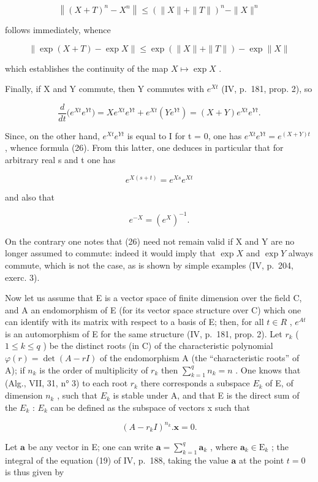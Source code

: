 \[
\left\| (X + T) ^ {n} - X ^ {n} \right\| \leqslant \left(\| X \| + \| T \|\right) ^ {n} - \| X \| ^ {n}
\]

follows immediately, whence

\[
\| \exp (X + T) - \exp X \| \leqslant \exp \left(\| X \| + \| T \|\right) - \exp \| X \|\tag{28}
\]

which establishes the continuity of the map \(X \mapsto \exp X\) .

Finally, if X and Y commute, then Y commutes with \(e^{Xt}\) (IV, p.~181, prop. 2), so

\[
\frac {d}{d t} \big (e ^ {X t} e ^ {Y t} \big) = X e ^ {X t} e ^ {Y t} + e ^ {X t} (Y e ^ {Y t}) = (X + Y) e ^ {X t} e ^ {Y t}.
\]

Since, on the other hand, \(e^{Xt}e^{Yt}\) is equal to I for t = 0, one has \(e^{Xt}e^{Yt} = e^{(X+Y)t}\) , whence formula (26). From this latter, one deduces in particular that for arbitrary real s and t one has

\[
e ^ {X (s + t)} = e ^ {X s} e ^ {X t}\tag{29}
\]

and also that

\[
e ^ {- X} = \left(e ^ {X}\right) ^ {- 1}.\tag{30}
\]

On the contrary one notes that (26) need not remain valid if X and Y are no longer assumed to commute: indeed it would imply that \(\exp X\) and \(\exp Y\) always commute, which is not the case, as is shown by simple examples (IV, p.~204, exerc. 3).

Now let us assume that E is a vector space of finite dimension over the field C, and A an endomorphism of E (for its vector space structure over C) which one can identify with its matrix with respect to a basis of E; then, for all \(t \in R\) , \(e^{At}\) is an automorphism of E for the same structure (IV, p.~181, prop. 2). Let \(r_k\) ( \(1 \leqslant k \leqslant q\) ) be the distinct roots (in C) of the characteristic polynomial \(\varphi(r) = \det(A - rI)\) of the endomorphism A (the ``characteristic roots'' of A); if \(n_k\) is the order of multiplicity of \(r_k\) then \(\sum_{k=1}^{q} n_k = n\) . One knows that (Alg., VII, 31, n° 3) to each root \(r_k\) there corresponds a subspace \(E_k\) of E, of dimension \(n_k\) , such that \(E_k\) is stable under A, and that E is the direct sum of the \(E_k\) : \(E_k\) can be defined as the subspace of vectors x such that

\[
(A - r _ {k} I) ^ {n _ {k}}. \mathbf {x} = 0.
\]

Let \(\mathbf{a}\) be any vector in E; one can write \(\mathbf{a} = \sum_{k=1}^{q} \mathbf{a}_k\) , where \(\mathbf{a}_k \in \mathrm{E}_k\) ; the integral of the equation (19) of IV, p.~188, taking the value \(\mathbf{a}\) at the point \(t = 0\) is thus given by

